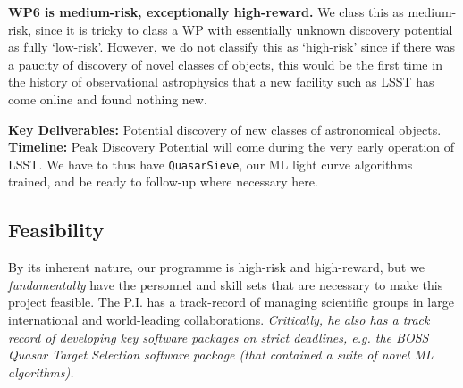\smallskip
\smallskip
\noindent
{\bf WP6 is medium-risk, exceptionally high-reward.}  We class this as
medium-risk, since it is tricky to class a WP with essentially unknown
discovery potential as fully `low-risk'. However, we do not classify
this as `high-risk' since if there was a paucity of discovery of novel
classes of objects, this would be the first time in the history of
observational astrophysics that a new facility such as LSST has come
online and found nothing new.  

\smallskip
\smallskip
\noindent
{\bf Key Deliverables:} Potential
discovery of new classes of astronomical objects.
{\bf Timeline:} Peak Discovery Potential will come during the 
very early operation of LSST. We have to thus have {\tt QuasarSieve}, 
our ML light curve algorithms trained, and be ready 
to follow-up where necessary here. 


\medskip  \medskip \smallskip \smallskip \noindent
\subsection{Feasibility}

\smallskip
\smallskip
\noindent
By its inherent nature, our programme is high-risk and high-reward, but
we {\it fundamentally} have the personnel and skill sets that are 
necessary to make this project feasible. 
The P.I. has a track-record of managing scientific groups in 
large international and world-leading collaborations. {\it Critically, 
he also has a track record of developing key software packages 
on strict deadlines, e.g. the BOSS Quasar Target Selection software 
package (that contained a suite of novel ML algorithms).}
%
%

%
%




